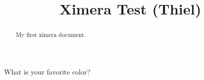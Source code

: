 \documentclass{ximera}
\title{Ximera Test (Thiel)}
\begin{document}
\begin{abstract}
My first ximera document.
\end{abstract}
\maketitle

\begin{question}
What is your favorite color? 
\end{question}
\end{document}
